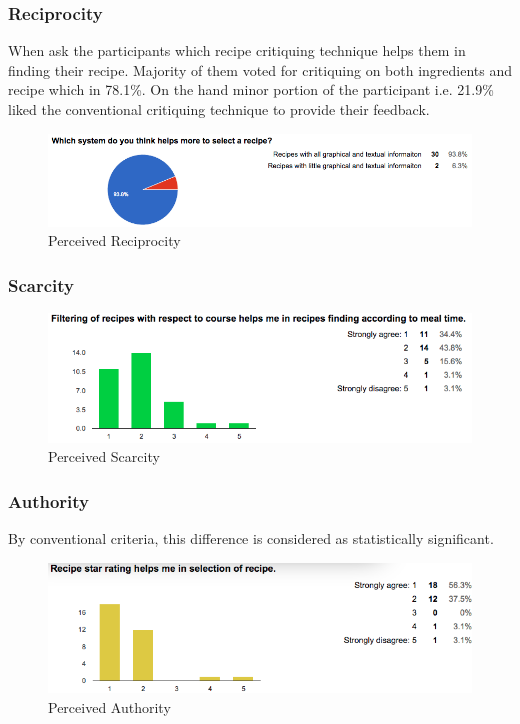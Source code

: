 \subsubsection{Reciprocity}

When ask the participants which recipe critiquing technique helps them in finding their recipe. Majority of them voted for critiquing on both ingredients and recipe which in 78.1\%. On the hand minor portion of the participant i.e. 21.9\% liked the conventional critiquing technique to provide their feedback.

\begin{figure}[h]
	\centering
	\includegraphics[width=0.7\linewidth]{figures/ch5_stat_reciprocity}
	\caption{Perceived Reciprocity}
	\label{fig:ch5_stat_reciprocity}
\end{figure}

\subsubsection{Scarcity}

\begin{figure}[h]
	\centering
	\includegraphics[width=0.7\linewidth]{figures/ch5_stat_scarcity.png}
	\caption{Perceived Scarcity}
	\label{fig:ch5_stat_scarcity}
\end{figure}

\subsubsection{Authority}

By conventional criteria, this difference is considered as statistically significant. 
\begin{figure}
	\centering
	\includegraphics[width=0.7\linewidth]{figures/ch5_stat_authority}
	\caption{Perceived Authority}
	\label{fig:ch5_stat_authority}
\end{figure}

